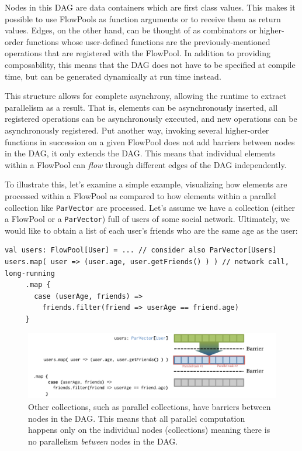 Nodes in this DAG are data containers which are first class
values. This makes it possible to use FlowPools as function arguments or to receive
them as return values. Edges, on the other hand, can be thought of as
combinators or higher-order functions whose user-defined functions are the
previously-mentioned operations that are registered with the FlowPool. In
addition to providing composability, this means that the DAG does not have to
be specified at compile time, but can be generated dynamically at run time
instead.

This structure allows for complete asynchrony, allowing the runtime to extract
parallelism as a result. That is, elements can be asynchronously inserted, all
registered operations can be asynchronously executed, and new operations can
be asynchronously registered.
Put another way, invoking several higher-order functions in succession on a given
FlowPool does not add barriers between nodes in the DAG, it only extends the DAG.
This means that individual elements within a FlowPool can \textit{flow} through
different edges of the DAG independently.

To illustrate this, let's examine a simple example, visualizing how elements are
processed within a FlowPool as compared to how elements within a parallel
collection like \verb|ParVector| are processed. Let's assume we have a
collection (either a FlowPool or a \verb|ParVector|) full of users of some
social network. Ultimately, we would like to obtain a list of each user's friends who are the same age as the user:

\begin{verbatim}
val users: FlowPool[User] = ... // consider also ParVector[Users]
users.map( user => (user.age, user.getFriends() ) ) // network call, long-running
     .map {
       case (userAge, friends) =>
         friends.filter(friend => userAge == friend.age)
     }
\end{verbatim}

\begin{figure}[!t]
\centering
\includegraphics[width=\textwidth]{images/barriers}
\caption{Other collections, such as parallel collections, have barriers between
nodes in the DAG. This means that all parallel computation happens only on the
individual nodes (collections) meaning there is no parallelism {\em between}
nodes in the DAG.}
\label{fig:barriers}
\end{figure}

